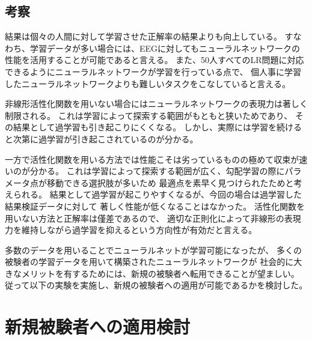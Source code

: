 
\subsection{\mc 考察}
結果は個々の人間に対して学習させた正解率の結果よりも向上している。
すなわち、学習データが多い場合には、EEGに対してもニューラルネットワークの性能を活用することが可能であると言える。
また、50人すべてのLR問題に対応できるようにニューラルネットワークが学習を行っている点で、
個人事に学習したニューラルネットワークよりも難しいタスクをこなしていると言える。

非線形活性化関数を用いない場合にはニューラルネットワークの表現力は著しく制限される。
これは学習によって探索する範囲がもともと狭いためであり、
その結果として過学習も引き起こりにくくなる。
しかし、実際には学習を続けると次第に過学習が引き起こされているのが分かる。

一方で活性化関数を用いる方法では性能こそは劣っているものの極めて収束が速いのが分かる。
これは学習によって探索する範囲が広く、勾配学習の際にパラメータ点が移動できる選択肢が多いため
最適点を素早く見つけられたためと考えられる。
結果として過学習が起こりやすくなるが、今回の場合は過学習した結果検証データに対して
著しく性能が低くなることはなかった。
活性化関数を用いない方法と正解率は僅差であるので、
適切な正則化によって非線形の表現力を維持しながら過学習を抑えるという方向性が有効だと言える。

多数のデータを用いることでニューラルネットが学習可能になったが、
多くの被験者の学習データを用いて構築されたニューラルネットワークが
社会的に大きなメリットを有するためには、新規の被験者へ転用できることが望ましい。
従って以下の実験を実施し、新規の被験者への適用が可能であるかを検討した。

\section{\mc 新規被験者への適用検討}
